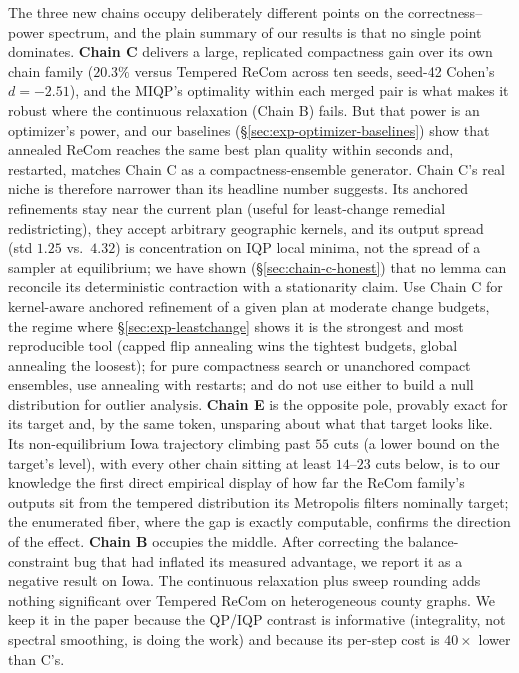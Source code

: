\documentclass[11pt]{article}
\begin{document}
The three new chains occupy deliberately different points on the
correctness--power spectrum, and the plain summary of our results is
that no single point dominates. \textbf{Chain C} delivers a large,
replicated compactness gain over its own chain family ($20.3\%$
versus Tempered ReCom across ten seeds, seed-42 Cohen's
$d = -2.51$), and the MIQP's
optimality within each merged pair is what makes it robust where the
continuous relaxation (Chain B) fails. But that power is an
optimizer's power, and our baselines
(\S\ref{sec:exp-optimizer-baselines}) show that annealed ReCom
reaches the same best plan quality within seconds and, restarted,
matches Chain C as a compactness-ensemble generator. Chain C's real
niche is therefore narrower than its headline number suggests. Its
anchored refinements stay near the current plan (useful for
least-change remedial redistricting), they accept arbitrary
geographic kernels, and its output spread (std $1.25$ vs.\ $4.32$) is
concentration on IQP local minima, not the spread of a sampler at
equilibrium; we have shown (\S\ref{sec:chain-c-honest}) that no lemma
can reconcile its deterministic contraction with a stationarity
claim. Use Chain C
for kernel-aware anchored refinement of a given plan at moderate
change budgets, the regime where \S\ref{sec:exp-leastchange} shows
it is the strongest and most reproducible tool (capped flip
annealing wins the tightest budgets, global annealing the loosest);
for pure
compactness search or unanchored compact ensembles, use annealing
with restarts; and do not use either to build a null distribution
for outlier analysis. \textbf{Chain E} is the
opposite pole, provably exact for its target and, by the same token,
unsparing about what that target looks like. Its non-equilibrium Iowa
trajectory climbing past $55$ cuts (a lower bound on the target's
level), with every other chain sitting at least $14$--$23$ cuts
below, is to our knowledge the first direct empirical display of how
far the ReCom family's outputs sit from the tempered distribution its
Metropolis filters nominally target; the enumerated fiber, where the
gap is exactly computable, confirms the direction of the effect. \textbf{Chain
B} occupies the middle. After correcting the balance-constraint
bug that had inflated its measured advantage, we report it as a
negative result on Iowa. The continuous relaxation plus sweep
rounding adds nothing significant over Tempered ReCom on
heterogeneous county graphs. We keep it in the paper because the
QP/IQP contrast is informative (integrality, not spectral
smoothing, is doing the work) and because its per-step cost is
$40\times$ lower than C's.
\end{document}
